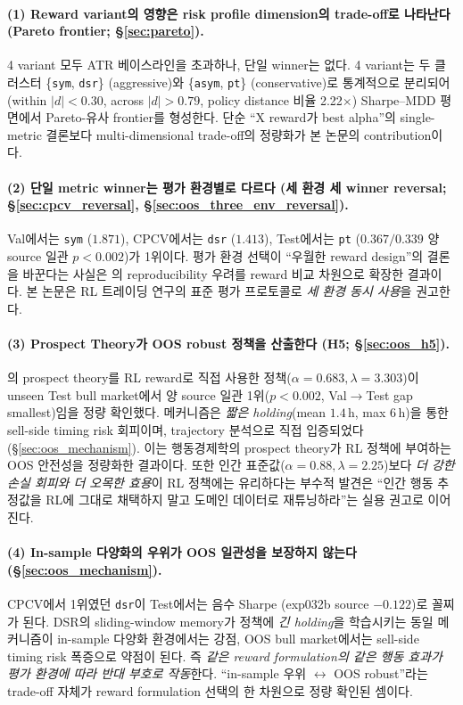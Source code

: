 \documentclass[11pt, a4paper]{article}
\begin{document}
\paragraph{(1) Reward variant의 영향은 risk profile dimension의 trade-off로
나타난다 (Pareto frontier; \S\ref{sec:pareto}).}
4 variant 모두 ATR 베이스라인을 초과하나, 단일 winner는 없다. 4 variant는
두 클러스터 \{\texttt{sym}, \texttt{dsr}\} (aggressive)와 \{\texttt{asym},
\texttt{pt}\} (conservative)로 통계적으로 분리되어 (within $|d|<0.30$,
across $|d|>0.79$, policy distance 비율 2.22$\times$) Sharpe--MDD 평면에서
Pareto-유사 frontier를 형성한다. 단순 ``X reward가 best alpha''의 single-metric
결론보다 multi-dimensional trade-off의 정량화가 본 논문의 contribution이다.

\paragraph{(2) 단일 metric winner는 평가 환경별로 다르다 (세 환경 세 winner
reversal; \S\ref{sec:cpcv_reversal}, \S\ref{sec:oos_three_env_reversal}).}
Val에서는 \texttt{sym} ($1.871$), CPCV에서는 \texttt{dsr} ($1.413$), Test에서는
\texttt{pt} ($0.367 / 0.339$ 양 source 일관 $p<0.002$)가 1위이다. 평가 환경
선택이 ``우월한 reward design''의 결론을 바꾼다는 사실은
\citet{henderson2018rlreproducibility}의 reproducibility 우려를 reward 비교
차원으로 확장한 결과이다. 본 논문은 RL 트레이딩 연구의 표준 평가 프로토콜로
\emph{세 환경 동시 사용}을 권고한다.

\paragraph{(3) Prospect Theory가 OOS robust 정책을 산출한다 (H5; \S\ref{sec:oos_h5}).}
\citet{kahneman1979prospect}의 prospect theory를 RL reward로 직접 사용한
정책($\alpha=0.683, \lambda=3.303$)이 unseen Test bull market에서 양 source
일관 1위($p<0.002$, Val$\to$Test gap smallest)임을 정량 확인했다. 메커니즘은
\emph{짧은 holding}(mean $1.4$\,h, max $6$\,h)을 통한 sell-side timing risk
회피이며, trajectory 분석으로 직접 입증되었다(\S\ref{sec:oos_mechanism}).
이는 행동경제학의 prospect theory가 RL 정책에 부여하는 OOS 안전성을
정량화한 결과이다. 또한 인간 표준값($\alpha=0.88, \lambda=2.25$)보다
\emph{더 강한 손실 회피와 더 오목한 효용}이 RL 정책에는 유리하다는 부수적 발견은
``인간 행동 추정값을 RL에 그대로 채택하지 말고 도메인 데이터로 재튜닝하라''는
실용 권고로 이어진다.

\paragraph{(4) In-sample 다양화의 우위가 OOS 일관성을 보장하지 않는다
(\S\ref{sec:oos_mechanism}).}
CPCV에서 1위였던 \texttt{dsr}이 Test에서는 음수 Sharpe (exp032b source $-0.122$)로
꼴찌가 된다. DSR의 sliding-window memory가 정책에 \emph{긴 holding}을 학습시키는
동일 메커니즘이 in-sample 다양화 환경에서는 강점, OOS bull market에서는 sell-side
timing risk 폭증으로 약점이 된다. 즉 \emph{같은 reward formulation의 같은 행동
효과가 평가 환경에 따라 반대 부호로 작동}한다. ``in-sample 우위 $\leftrightarrow$
OOS robust''라는 trade-off 자체가 reward formulation 선택의 한 차원으로
정량 확인된 셈이다.
\end{document}
